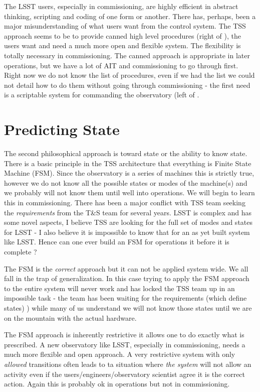 The LSST users, especially in commissioning, are highly efficient in abstract thinking, scripting and coding of one form or another. There has, perhaps,  been  a major misunderstanding of what users want from the control system. The TSS approach seems to be to provide canned high level procedures (right of ), the users want and need a much more open and flexible system.
The flexibility is totally necessary in commissioning.
The canned approach is appropriate in later operations, but we have  a lot of AIT and commissioning to go through first.
Right now we do not know the list of procedures, even if we had the list we could not detail how to do them without going through commissioning - the first need is a scriptable system for commanding the observatory (left of .


\section{Predicting State}

The second philosophical approach is toward state or the ability to know state. There is a basic principle in the TSS architecture that everything is  Finite State Machine (FSM).
Since the observatory is a series of machines this is strictly true, however we do not know all the possible states or modes of the machine(s) and we probably will not know them until well into operations.
We will begin to learn this in commissioning. There has been a major conflict with  TSS team seeking the {\em requirements} from the T\&S team for several years.  LSST is complex and has some novel aspects, I believe TSS are looking for the full set of modes and states for LSST - I also believe it is impossible to know that for an as yet built system like LSST. Hence can one ever build an FSM for operations it before it is complete ?

The FSM is the {\em correct} approach  but it can not be applied system wide. We all fall in the trap of generalization.
In this case trying to apply the FSM approach to the entire system will never work and has locked the TSS team up in an impossible task -
the team has been waiting for the requirements (which define states) ) while many of us understand we will not know those states until we are on the mountain with the actual hardware.

The FSM approach is inherently restrictive  it allows one to do exactly what is prescribed. A new observatory like LSST, especially in commissioning, needs a much more flexible and open approach. A very restrictive system with only {\em allowed} transitions often leads to ta situation where {\em the system} will not allow an activity even if the users/engineers/observatory scientist agree it is the correct action. Again this is probably ok in operations but not in commissioning.

